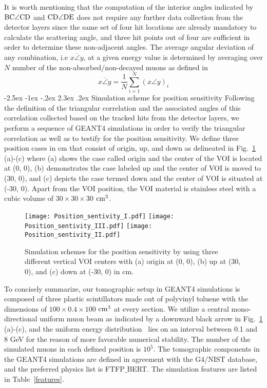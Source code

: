 \documentclass[10.75pt]{article}
\makeatletter
\renewcommand\section{\@startsection{section}{1}{\z@}%
   {-2.5ex \@plus -1ex \@minus -.2ex}%
   {2.3ex \@plus.2ex}%
   {\normalfont\large\bfseries}}
\makeatother
\begin{document}
It is worth mentioning that the computation of the interior angles indicated by $\rm  BC\angle CD$ and $\rm  CD\angle DE$ does not require any further data collection from the detector layers since the same set of four hit locations are already mandatory to calculate the scattering angle, and three hit points out of four are sufficient in order to determine these non-adjacent angles. The average angular deviation of any combination, i.e  $\overline{x\angle y}$, at a given energy value is determined by averaging over $N$ number of the non-absorbed/non-decayed muons as defined in 
\begin{equation}
\overline{x\angle y}=\frac{1}{N}\sum^{N}_{i=1}(x\angle y)_{i}
\end{equation}
\section{Simulation scheme for position sensitivity}
\label{simulation scheme}
Following the definition of the triangular correlation and the associated angles of this correlation collected based on the tracked hits from the detector layers, we perform a sequence of GEANT4 simulations in order to verify the triangular correlation as well as to testify for the position sensitivity. We define three position cases in cm that consist of origin, up, and down as delineated in Fig.~\ref{position} (a)-(c) where (a) shows the case called origin and the center of the VOI is located at (0, 0), (b) demonstrates the case labeled up and the center of VOI is moved to (30, 0), and (c) depicts the case termed down and the center of VOI is situated at (-30, 0). Apart from the VOI position, the VOI material is stainless steel with a cubic volume of $30\times30\times30$ $\rm cm^{3}$.
\begin{figure}[H]
\begin{center}
\texttt{[image: Position\_sentivity\_I.pdf]}
\hskip 0.5cm
\texttt{[image: Position\_sentivity\_III.pdf]}
\hskip 0.5cm
\texttt{[image: Position\_sentivity\_II.pdf]}
\caption{Simulation schemes for the position sensitivity by using three different vertical VOI centers with (a) origin at (0, 0), (b) up at (30, 0), and (c) down at (-30, 0) in cm.}
\label{position}
\end{center}
\end{figure}
\vskip -0.25cm
To concisely summarize, our tomographic setup in GEANT4 simulations is composed of three plastic scintillators made out of polyvinyl toluene with the dimensions of $100\times0.4\times100$ $\rm cm^{3}$ at every section. We utilize a central mono-directional uniform muon beam as indicated by a downward black arrow in Fig.~\ref{position} (a)-(c), and the uniform energy distribution~\cite{anghel2015plastic} lies on an interval between 0.1 and 8 GeV for the reason of more favorable numerical stability. The number of the simulated muons in each defined position is $10^{5}$. The tomographic components in the GEANT4 simulations are defined in agreement with the G4/NIST database, and the preferred physics list is FTFP$\_$BERT. The simulation features are listed in Table~\ref{features}.
\end{document}
